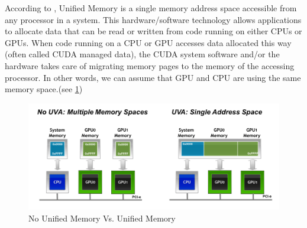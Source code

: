 \documentclass[article]{scrartcl}
\begin{document}
According to \cite{unifiedMemory}, Unified Memory is a single memory address space accessible from any processor in a system. 
This hardware/software technology allows applications to allocate data that can be read or written from code running on either CPUs or GPUs. 
When code running on a CPU or GPU accesses data allocated this way (often called CUDA managed data), 
the CUDA system software and/or the hardware takes care of migrating memory pages to the memory of the accessing processor.
In other words, we can assume that GPU and CPU are using the same memory space.(see \ref{fig:UnifiedMemory})
\begin{figure}[htpb]
	\centering
	\includegraphics[width=\textwidth,keepaspectratio=true]{../figs/UnifiedMemoryCompare.png}
	\caption{No Unified Memory Vs. Unified Memory\cite{introCudaAware}}
	\label{fig:UnifiedMemory}
\end{figure}

\end{document}
